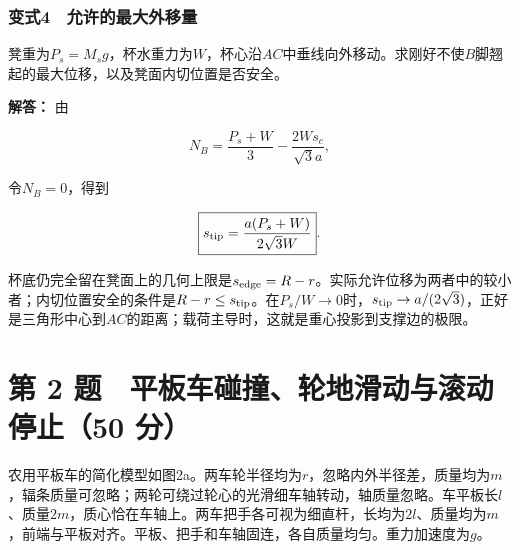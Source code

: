\documentclass[12pt,a4paper,fontset=fandol]{ctexart}
\begin{document}
\par\noindent\begin{minipage}{\linewidth}
\subsubsection{变式4　允许的最大外移量}\label{ux53d8ux5f0f4-ux5141ux8bb8ux7684ux6700ux5927ux5916ux79fbux91cf}

凳重为\(P_s=M_sg\)，杯水重力为\(W\)，杯心沿\(AC\)中垂线向外移动。求刚好不使\(B\)脚翘起的最大位移，以及凳面内切位置是否安全。

\textbf{解答：} 由

\[
N_B=\frac{P_s+W}{3}-\frac{2Ws_c}{\sqrt3a},
\]

令\(N_B=0\)，得到

\[
\boxed{s_{\rm tip}=\frac{a(P_s+W)}{2\sqrt3W}}.
\]

杯底仍完全留在凳面上的几何上限是\(s_{\rm edge}=R-r\)。实际允许位移为两者中的较小者；内切位置安全的条件是\(R-r\le s_{\rm tip}\)。在\(P_s/W\to0\)时，\(s_{\rm tip}\to a/(2\sqrt3)\)，正好是三角形中心到\(AC\)的距离；载荷主导时，这就是重心投影到支撑边的极限。

\end{minipage}\par
\clearpage

\section{第 2 题　平板车碰撞、轮地滑动与滚动停止（50
分）}\label{ux7b2c-2-ux9898-ux5e73ux677fux8f66ux78b0ux649eux8f6eux5730ux6ed1ux52a8ux4e0eux6edaux52a8ux505cux6b6250-ux5206}

农用平板车的简化模型如图2a。两车轮半径均为\(r\)，忽略内外半径差，质量均为\(m\)，辐条质量可忽略；两轮可绕过轮心的光滑细车轴转动，轴质量忽略。车平板长\(l\)、质量\(2m\)，质心恰在车轴上。两车把手各可视为细直杆，长均为\(2l\)、质量均为\(m\)，前端与平板对齐。平板、把手和车轴固连，各自质量均匀。重力加速度为\(g\)。
\end{document}
